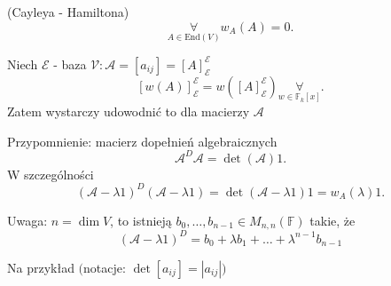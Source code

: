 \documentclass[../main.tex]{subfiles}
\begin{document}
\begin{tw}
    (Cayleya - Hamiltona)
    \[
        \underset{A\in \text{End}(V)}{\forall} w_A(A) = 0
    .\]
\end{tw}
\begin{dowod}
    Niech $\mathcal{E}$ - baza $\mathcal{V}: \mathcal{A} = [ a_{ij} ] = \left[ A \right] _\mathcal{E}^\mathcal{E}$
    \[
        \left[ w(A) \right]_\mathcal{E}^\mathcal{E} = w\left( \left[ A \right] _\mathcal{E}^\mathcal{E} \right) \underset{w\in \mathbb{F}_k [x]}{\forall}
    .\]
    Zatem wystarczy udowodnić to dla macierzy $\mathcal{A}$

    Przypomnienie: macierz dopełnień algebraicznych \[
        \mathcal{A}^{D}\mathcal{A} = \det(\mathcal{A}) 1
    .\]
    W szczególności \[
        (\mathcal{A} - \lambda 1)^D (\mathcal{A} - \lambda 1 ) = \det(\mathcal{A} - \lambda 1) 1 = w_A(\lambda) 1
    .\]

    Uwaga: $n = \dim V$, to istnieją  $b_0,\ldots,b_{n-1} \in M_{n,n}(\mathbb{F})$ takie, że
    \begin{equation}\label{eq:100}
        (\mathcal{A} - \lambda 1)^D = b_0 + \lambda b_1 + \ldots + \lambda^{n-1} b_{n-1}
    \end{equation}

    Na przykład $($notacje: $\det \left[ a_{ij} \right] = \left| a_{ij} \right| )$


\end{dowod}
\end{document}
